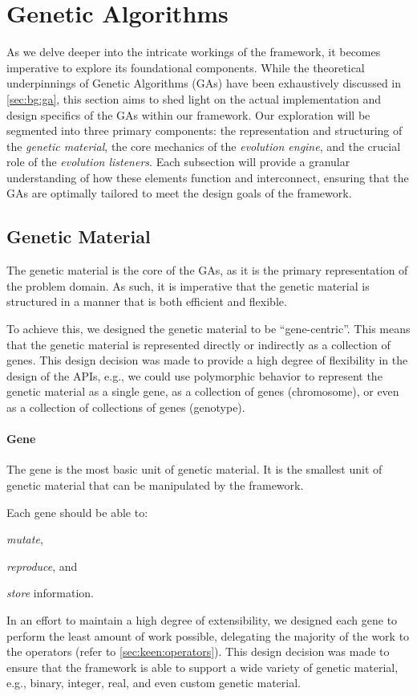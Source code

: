 \section{Genetic Algorithms}
\label{sec:genetic_algorithms}
  As we delve deeper into the intricate workings of the framework, it becomes 
  imperative to explore its foundational components.
  While the theoretical underpinnings of Genetic Algorithms (GAs) have been 
  exhaustively discussed in \vref{sec:bg:ga}, this section aims to shed light 
  on the actual implementation and design specifics of the GAs within our 
  framework.
  Our exploration will be segmented into three primary components: the 
  representation and structuring of the \emph{genetic material}, the core 
  mechanics of the \emph{evolution engine}, and the crucial role of the \emph{evolution listeners}.
  Each subsection will provide a granular understanding of how these elements 
  function and interconnect, ensuring that the GAs are optimally tailored to 
  meet the design goals of the framework.
  
  \subsection{Genetic Material}
  \label{sec:keen:ga:material}
    The genetic material is the core of the GAs, as it is the primary
    representation of the problem domain.
    As such, it is imperative that the genetic material is structured in a
    manner that is both efficient and flexible.

    To achieve this, we designed the genetic material to be 
    \enquote{gene-centric}.
    This means that the genetic material is represented directly or indirectly
    as a collection of genes.
    This design decision was made to provide a high degree of flexibility in
    the design of the APIs, e.g., we could use polymorphic behavior to
    represent the genetic material as a single gene, as a collection of genes 
    (chromosome), or even as a collection of collections of genes (genotype).

    \paragraph{Gene}
      The gene is the most basic unit of genetic material.
      It is the smallest unit of genetic material that can be manipulated by
      the framework.
      
      Each gene should be able to:
      \begin{enumerate*}
        \item \textit{mutate},
        \item \textit{reproduce}, and
        \item \textit{store} information.
      \end{enumerate*}
      In an effort to maintain a high degree of extensibility, we designed each
      gene to perform the least amount of work possible, delegating the
      majority of the work to the operators (refer to \vref{sec:keen:operators}).
      This design decision was made to ensure that the framework is able to
      support a wide variety of genetic material, e.g., binary, integer, real,
      and even custom genetic material.

